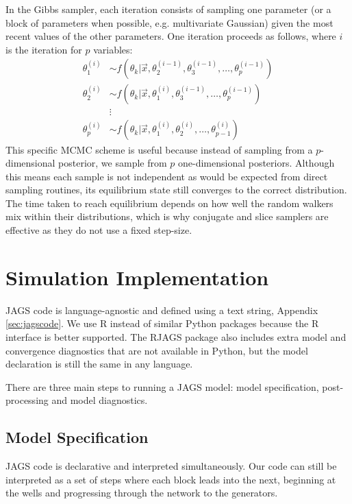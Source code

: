 \documentclass[a4paper, 12pt]{article}
\begin{document}
In the Gibbs sampler, each iteration consists of sampling one parameter (or a block of parameters when possible, e.g. multivariate Gaussian) given the most recent values of the other parameters. One iteration proceeds as follows, where $i$ is the iteration for $p$ variables:
\begin{align}
\theta_1^{(i)} &\sim f\left( \theta_k|\vec{x}, \theta_2^{(i-1)}, \theta_3^{(i-1)},\dots, \theta_p^{(i-1)} \right)\\
\theta_2^{(i)} &\sim f\left( \theta_k|\vec{x}, \theta_1^{(i)}, \theta_3^{(i-1)},\dots, \theta_p^{(i-1)} \right)\\
&\vdots\nonumber\\
\theta_p^{(i)} &\sim f\left( \theta_k|\vec{x}, \theta_1^{(i)}, \theta_2^{(i)},\dots, \theta_{p-1}^{(i)} \right)
\end{align}
This specific MCMC scheme is useful because instead of sampling from a $p$-dimensional posterior, we sample from $p$ one-dimensional posteriors. Although this means each sample is not independent as would be expected from direct sampling routines, its equilibrium state still converges to the correct distribution. The time taken to reach equilibrium depends on how well the random walkers mix within their distributions, which is why conjugate and slice samplers are effective as they do not use a fixed step-size.


\section{Simulation Implementation}
JAGS code is language-agnostic and defined using a text string, Appendix \ref{sec:jagscode}. We use R instead of similar Python packages because the R interface is better supported. The RJAGS package also includes extra model and convergence diagnostics that are not available in Python, but the model declaration is still the same in any language.

There are three main steps to running a JAGS model: model specification, post-processing and model diagnostics.

\subsection{Model Specification}
JAGS code is declarative and interpreted simultaneously. Our code can still be interpreted as a set of steps where each block leads into the next, beginning at the wells and progressing through the network to the generators.
\end{document}
